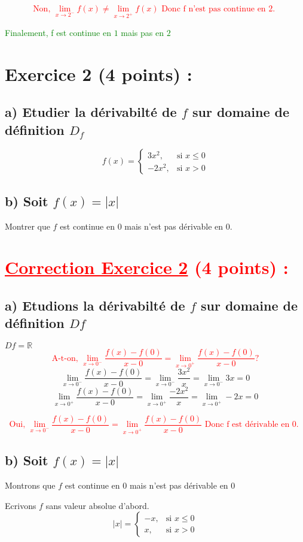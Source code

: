 \documentclass[12pt]{article}
\begin{document}
\textcolor{red}{\[\text{Non, } \lim_{x \to 2^{-}}f(x)\neq\lim_{x \to 2^{+}}f(x)\text{ Donc f n'est pas continue en 2. }\]}

\textcolor{green}{Finalement, f est continue en $1$ mais pas en $2$}
\section*{Exercice 2 (4 points) :}
\subsection*{a) Etudier la dérivabilté de $f$ sur domaine de définition $D_{f}$}
\[ f(x) = \begin{cases} 
  3x^{2}, & \text{si } x \leq 0 \\
  -2x^{2}, & \text{si } x > 0 
\end{cases} \]
\subsection*{b) Soit $f(x)=|x|$ }
Montrer que $f$ est continue en 0 mais n'est pas dérivable en 0.
\section*{\textcolor{red}{\underline{Correction Exercice 2} (4 points) :}}
\subsection*{a) Etudions la dérivabilté de $f$ sur domaine de définition $Df$}
$Df=\mathbb{R}$
\textcolor{red}{\[\text{A-t-on, } \lim_{x \to 0^{-}}\frac{f(x)-f(0)}{x-0}=\lim_{x \to 0^{+}}\frac{f(x)-f(0)}{x-0}?\]}
\[\lim_{x \to 0^{-}}\frac{f(x)-f(0)}{x-0}=\lim_{x \to 0^{-}}\frac{3x^{2}}{x}=\lim_{x \to 0^{-}}3x=0\]
\[\lim_{x \to 0^{+}}\frac{f(x)-f(0)}{x-0}=\lim_{x \to 0^{+}}\frac{-2x^{2}}{x}=\lim_{x \to 0^{+}}-2x=0\]

\textcolor{red}{\[\text{Oui, } \lim_{x \to 0^{-}}\frac{f(x)-f(0)}{x-0}=\lim_{x \to 0^{+}}\frac{f(x)-f(0)}{x-0}\text{ Donc f est dérivable en 0. }\]}
\subsection*{b) Soit $f(x)=|x|$ }
Montrons que $f$ est continue en 0 mais n'est pas dérivable en 0

Ecrivons $f$ sans valeur absolue d'abord.
\[ |x| = \begin{cases} 
  -x, & \text{si } x \leq 0 \\
  x, & \text{si } x > 0 
\end{cases} \]
\end{document}
